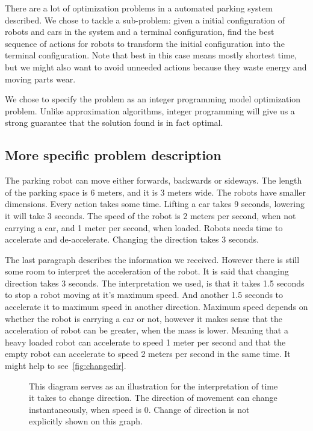 There are a lot of optimization problems in a automated parking system
described. We chose to tackle a sub-problem: given a initial configuration of
robots and cars in the system and a terminal configuration, find the best
sequence of actions for robots to transform the initial configuration into the
terminal configuration. Note that best in this case means mostly shortest time,
but we might also want to avoid unneeded actions because they waste energy and
moving parts wear.


We chose to specify the problem as an integer programming model optimization
problem. Unlike approximation algorithms, integer programming will give us a
strong guarantee that the solution found is in fact optimal.

\subsection{More specific problem description}
The parking robot can move either forwards, backwards or sideways. The length of
the parking space is 6 meters, and it is 3 meters wide. The robots have smaller
dimensions. Every action takes some time. Lifting a car takes 9 seconds,
lowering it will take 3 seconds. The speed of the robot is 2 meters per second,
when not carrying a car, and 1 meter per second, when loaded. Robots needs time
to accelerate and de-accelerate. Changing the direction takes 3 seconds.

The last paragraph describes the information we received. However there is still
some room to interpret the acceleration of the robot. It is said that changing
direction takes 3 seconds. The interpretation we used, is that it takes 1.5
seconds to stop a robot moving at it's maximum speed. And another 1.5 seconds to
accelerate it to maximum speed in another direction. Maximum speed depends on
whether the robot is carrying a car or not, however it makes sense that the
acceleration of robot can be greater, when the mass is lower. Meaning that a
heavy loaded robot can accelerate to speed 1 meter per second and that the empty
robot can accelerate to speed 2 meters per second in the same time. It might
help to see~\autoref{fig:changedir}.

\begin{figure}[h]
    \begin{center}
        
        \caption{This diagram serves as an illustration for the interpretation of
            time it takes to change direction. The direction of movement can change
            instantaneously, when speed is 0. Change of direction is not explicitly shown on
            this graph.}
        \label{fig:changedir}
    \end{center}
\end{figure}

